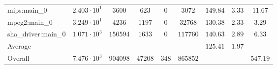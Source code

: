 \begin{tabular}{|l|c|c|c|c|c|c|c|c|}
mips:main\_0            & $ 2.403 \cdot 10^{1} $ & $ 3600   $ & $ 623   $ & $ 0   $ & $ 3072   $ & $ 149.84      $ & $ 3.33    $ & $ 11.67   $ \\
mpeg2:main\_0           & $ 3.249 \cdot 10^{1} $ & $ 4236   $ & $ 1197  $ & $ 0   $ & $ 32768  $ & $ 130.38      $ & $ 2.33    $ & $ 3.29    $ \\
sha\_driver:main\_0     & $ 1.071 \cdot 10^{3} $ & $ 150594 $ & $ 1633  $ & $ 0   $ & $ 117760 $ & $ 140.63      $ & $ 2.89    $ & $ 6.33    $ \\
\hline
Average                 & $                    $ & $        $ & $       $ & $     $ & $        $ & $ 125.41      $ & $ 1.97    $ & $         $ \\
\hline
Overall                 & $ 7.476 \cdot 10^{3} $ & $ 904098 $ & $ 47208 $ & $ 348 $ & $ 865852 $ & $             $ & $         $ & $ 547.19  $ \\
\hline
\end{tabular}
